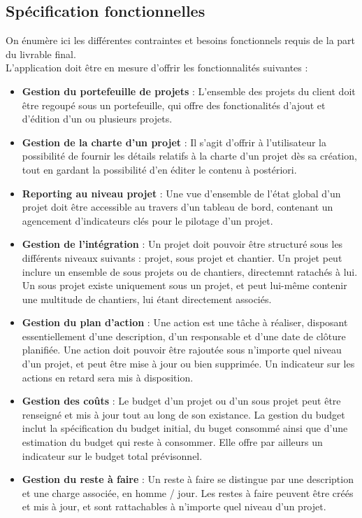 \begin{spacing}{1.5}
\subsection{Spécification fonctionnelles}
On énumère ici les différentes contraintes et besoins fonctionnels requis de la part du livrable final.\\
L’application doit être en mesure d’offrir les fonctionnalités suivantes :
\begin{itemize}
    \item \textbf{Gestion du portefeuille de projets} : L'ensemble des projets du client doit être regoupé sous un portefeuille, qui offre des fonctionalités d'ajout et d'édition d'un ou plusieurs projets.
    \item \textbf{Gestion de la charte d'un projet} : Il s'agit d'offrir à l'utilisateur la possibilité de fournir les détails relatifs à la charte d'un projet dès sa création, tout en gardant la possibilité d'en éditer le contenu à postériori.
    \item \textbf{Reporting au niveau projet} : Une vue d'ensemble de l'état global d'un projet doit être accessible au travers d'un tableau de bord, contenant un agencement d'indicateurs clés pour le pilotage d'un projet.
    \item \textbf{Gestion de l'intégration} : Un projet doit pouvoir être structuré sous les différents niveaux suivants : projet, sous projet et chantier. Un projet peut inclure un ensemble de sous projets ou de chantiers, directemnt ratachés à lui. Un sous projet existe uniquement sous un projet, et peut lui-même contenir une multitude de chantiers, lui étant directement associés.
    \item \textbf{Gestion du plan d'action} : Une action est une tâche à réaliser, disposant essentiellement d'une description, d'un responsable et d'une date de clôture planifiée. Une action doit pouvoir être rajoutée sous n'importe quel niveau d'un projet, et peut être mise à jour ou bien supprimée. Un indicateur sur les actions en retard sera mis à disposition.
    \item \textbf{Gestion des coûts} : Le budget d'un projet ou d'un sous projet peut être renseigné et mis à jour tout au long de son existance. La gestion du budget inclut la spécification du budget initial, du buget consommé ainsi que d'une estimation du budget qui reste à consommer. Elle offre par ailleurs un indicateur sur le budget total prévisonnel.
    \item \textbf{Gestion du reste à faire} : Un reste à faire se distingue par une description et une charge associée, en homme / jour. Les restes à faire peuvent être créés et mis à jour, et sont rattachables à n'importe quel niveau d'un projet.

\end{itemize}
\end{spacing}
